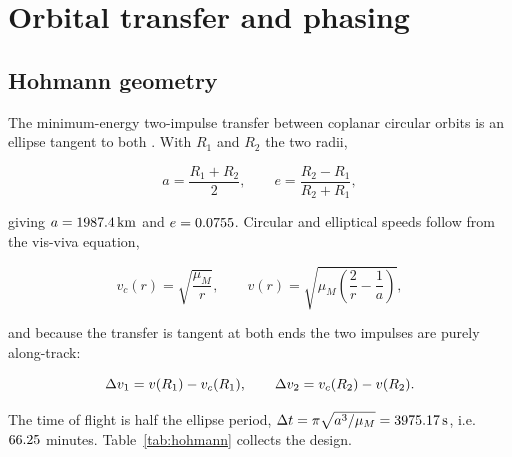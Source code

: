 \section{Orbital transfer and phasing}
\label{sec:transfer}

\subsection{Hohmann geometry}

The minimum-energy two-impulse transfer between coplanar circular orbits is an
ellipse tangent to both \cite{curtis}. With $R_1$ and $R_2$ the two radii,

\begin{equation}
a = \frac{R_1 + R_2}{2}, \qquad
e = \frac{R_2 - R_1}{R_2 + R_1},
\label{eq:ellipse}
\end{equation}

giving $a = 1987.4\,\mathrm{km}$ and $e = 0.0755$. Circular and elliptical speeds
follow from the vis-viva equation,

\begin{equation}
v_c(r) = \sqrt{\frac{\mu_M}{r}}, \qquad
v(r) = \sqrt{\mu_M\!\left(\frac{2}{r} - \frac{1}{a}\right)},
\label{eq:visviva}
\end{equation}

and because the transfer is tangent at both ends the two impulses are purely
along-track:

\begin{equation}
\Delta v_1 = v(R_1) - v_c(R_1), \qquad
\Delta v_2 = v_c(R_2) - v(R_2).
\label{eq:dv}
\end{equation}

The time of flight is half the ellipse period,
$\Delta t = \pi\sqrt{a^3/\mu_M} = 3975.17\,\mathrm{s}$, i.e.\ $66.25$ minutes.
Table~\ref{tab:hohmann} collects the design.

